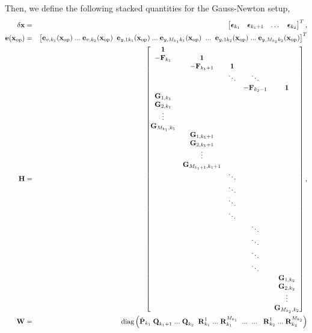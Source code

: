 \documentclass[a4paper]{article}
\begin{document}
Then, we define the following stacked quantities for the Gauss-Newton setup,
\begin{eqnarray}
    \delta \bm{\mathbf{x}} &=& \begin{bmatrix}
      \bm{\mathbf{\epsilon}}_{k_1} & \bm{\mathbf{\epsilon}}_{k_1+1} & \dots & \bm{\mathbf{\epsilon}}_{k_2} 
    \end{bmatrix}^T, \\
    \bm{\mathbf{e}}(\bm{\mathbf{x}}_{\text{op}}) &=& \begin{bmatrix}
      \bm{\mathbf{e}}_{v,k_1}(\bm{\mathbf{x}}_{\text{op}})\; ...\;\bm{\mathbf{e}}_{v, k_2}(\bm{\mathbf{x}}_{\text{op}}) \;\;
      \bm{\mathbf{e}}_{y,1 k_1}(\bm{\mathbf{x}}_{\text{op}})\;...\;\bm{\mathbf{e}}_{y,M_{k_1} k_1}(\bm{\mathbf{x}}_{\text{op}}) \;\; ... \;\; \bm{\mathbf{e}}_{y,1 k_2}(\bm{\mathbf{x}}_{\text{op}})\;...\;\bm{\mathbf{e}}_{y,M_{k_2} k_2}(\bm{\mathbf{x}}_{\text{op}})
    \end{bmatrix}^T\\
    \bm{\mathbf{H}} &=& \begin{bmatrix}
        \bm{\mathbf{1}}   \\
      -\bm{\mathbf{F}}_{k_1} & \bm{\mathbf{1}}          & &&\\
                     & -\bm{\mathbf{F}}_{k_1+1} & \bm{\mathbf{1}} \\
      && \ddots & \ddots \\
      &&& -\bm{\mathbf{F}}_{k_2-1} & \bm{\mathbf{1}}\\
      \bm{\mathbf{G}}_{1,k_1}\\
      \bm{\mathbf{G}}_{2,k_1}\\
      \vdots\\
      \bm{\mathbf{G}}_{M_{k_1},k_1}\\
      &\bm{\mathbf{G}}_{1,k_1+1}\\
      &\bm{\mathbf{G}}_{2,k_1+1}\\
      &\vdots\\
      &\bm{\mathbf{G}}_{M_{k_1+1},k_1+1}\\
      &&\ddots\\
      &&\ddots\\
      &&\ddots\\
      &&\ddots\\
      &&&\ddots\\
      &&&\ddots\\
      &&&\ddots\\
      &&&\ddots\\      
      &&&&\bm{\mathbf{G}}_{1,k_2}\\
      &&&&\bm{\mathbf{G}}_{2,k_2}\\
      &&&&\vdots\\
      &&&&\bm{\mathbf{G}}_{M_{k_2},k_2}
    \end{bmatrix},\\
    \bm{\mathbf{W}} &=& \text{diag} \left(
      \check{\bm{\mathbf{P}}}_{k_1} \; \bm{\mathbf{Q}}_{k_1+1}\; ...\; \bm{\mathbf{Q}}_{k_2} \;\; {\bm{\mathbf{R}}_{k_1}^{1}}\;...\;{\bm{\mathbf{R}}_{k_1}^{M_{k_1}}}\;\;...\;\;... \;\;\;{\bm{\mathbf{R}}_{k_2}^{1}}\;...\; {\bm{\mathbf{R}}_{k_2}^{M_{k_2}}} \right)
\end{eqnarray}
\end{document}
